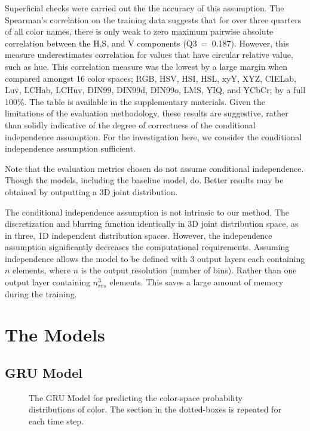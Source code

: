\documentclass[11pt,letterpaper]{article}
\begin{document}
Superficial checks were carried out the the accuracy of this assumption.
The Spearman's correlation on the training data suggests that for over three quarters of all color names, there is only weak to zero maximum pairwise absolute correlation between the H,S, and V components (\mbox{Q3 = 0.187}).
However, this measure underestimates correlation for values that have circular relative value, such as hue.
This correlation measure was the lowest by a large margin  when compared amongst 16 color spaces; RGB, HSV, HSI, HSL, xyY, XYZ, CIELab, Luv, LCHab, LCHuv, DIN99, DIN99d, DIN99o, LMS, YIQ, and YCbCr; by a full 100\%.
The table is available in the supplementary materials.
Given the limitations of the evaluation methodology, these results are suggestive, rather than solidly indicative of the degree of correctness of the conditional independence assumption.
For the investigation here, we consider the conditional independence assumption sufficient.

Note that the evaluation metrics chosen do not assume conditional independence.
Though the models, including the baseline model, do.
Better results may be obtained by outputting a 3D joint distribution.

The conditional independence assumption is not intrinsic to our method.
The discretization and blurring function identically in 3D joint distribution space,
as in three, 1D independent distribution spaces.
However, the independence assumption significantly decreases the computational requirements.
Assuming independence allows the model to be defined with 3 output layers each containing $n$ elements, where $n$ is the output resolution (number of bins).
Rather than one output layer containing $n_{res}^3$ elements.
This saves a large amount of memory during the training.


\section{The Models}

\subsection{GRU Model}

\begin{figure}
	\resizebox{\columnwidth}{!}{}

	\caption{\label{network}
		The GRU Model for predicting the color-space probability distributions of color.
		The section in the dotted-boxes is repeated for each time step.
		}
\end{figure}
\end{document}
